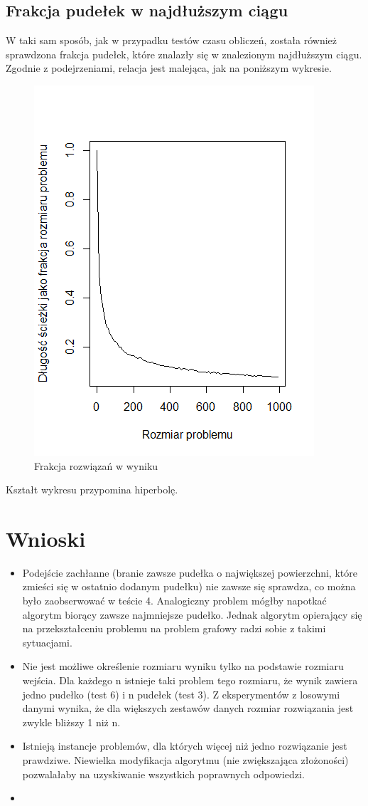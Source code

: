 \documentclass{article}
\begin{document}
\subsection{Frakcja pudełek w najdłuższym ciągu}
W taki sam sposób, jak w przypadku testów czasu obliczeń, została również sprawdzona frakcja pudełek, które znalazły się w znalezionym najdłuższym ciągu. Zgodnie z podejrzeniami, relacja jest malejąca, jak na poniższym wykresie.
\begin{figure}[H]
\centering
\includegraphics{dlugosc.png}
\caption{Frakcja rozwiązań w wyniku}
\end{figure}
Kształt wykresu przypomina hiperbolę.
\clearpage
\section{Wnioski}
\begin{itemize}
\item Podejście zachłanne (branie zawsze pudełka o największej powierzchni, które zmieści się w ostatnio dodanym pudełku) nie zawsze się sprawdza, co można było zaobserwować w teście 4. Analogiczny problem mógłby napotkać algorytm biorący zawsze najmniejsze pudełko. Jednak algorytm opierający się na przekształceniu problemu na problem grafowy radzi sobie z takimi sytuacjami.
\item Nie jest możliwe określenie rozmiaru wyniku tylko na podstawie rozmiaru wejścia. Dla każdego n istnieje taki problem tego rozmiaru, że wynik zawiera jedno pudełko (test 6) i n pudełek (test 3). Z eksperymentów z losowymi danymi wynika, że dla większych zestawów danych rozmiar rozwiązania jest zwykle bliższy 1 niż n.
\item Istnieją instancje problemów, dla których więcej niż jedno rozwiązanie jest prawdziwe. Niewielka modyfikacja algorytmu (nie zwiększająca złożoności) pozwalałaby na uzyskiwanie wszystkich poprawnych odpowiedzi.
\item 
\end{itemize}
\end{document}

